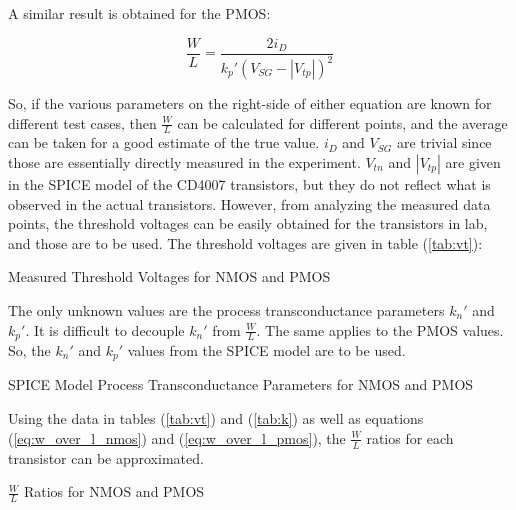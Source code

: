 A similar result is obtained for the PMOS:

\begin{equation}
	\label{eq:w_over_l_pmos}
	\frac{W}{L} = \frac{ 2 i_{D}}{k_{p}' (V_{SG} - |V_{tp}|)^{2}}
\end{equation}

So, if the various parameters on the right-side of either equation are known for different test cases, then $\frac{W}{L}$ can be calculated for different points, and the average can be taken for a good estimate of the true value.
$i_{D}$ and $V_{SG}$ are trivial since those are essentially directly measured in the experiment.
$V_{tn}$ and $|V_{tp}|$ are given in the SPICE model of the CD4007 transistors, but they do not reflect what is observed in the actual transistors.
However, from analyzing the measured data points, the threshold voltages can be easily obtained for the transistors in lab, and those are to be used.
The threshold voltages are given in table (\ref{tab:vt}):

\FloatBarrier

\begin{table}[h!]
	\centering
	\caption{Measured Threshold Voltages for NMOS and PMOS}
	\label{tab:vt}
\end{table}

\FloatBarrier

The only unknown values are the process transconductance parameters $k_{n}'$ and $k_{p}'$.
It is difficult to decouple $k_{n}'$ from $\frac{W}{L}$.
The same applies to the PMOS values.
So, the $k_{n}'$ and $k_{p}'$ values from the SPICE model are to be used.

\FloatBarrier

\begin{table}[h!]
	\centering
	\caption{SPICE Model Process Transconductance Parameters for NMOS and PMOS}
	\label{tab:k}
\end{table}

\FloatBarrier

Using the data in tables (\ref{tab:vt}) and (\ref{tab:k}) as well as equations (\ref{eq:w_over_l_nmos}) and (\ref{eq:w_over_l_pmos}), the $\frac{W}{L}$ ratios for each transistor can be approximated.

\FloatBarrier

\begin{table}[h!]
	\centering
	\caption{$\frac{W}{L}$ Ratios for NMOS and PMOS}
	\label{tab:w_over_l}
\end{table}

\FloatBarrier
